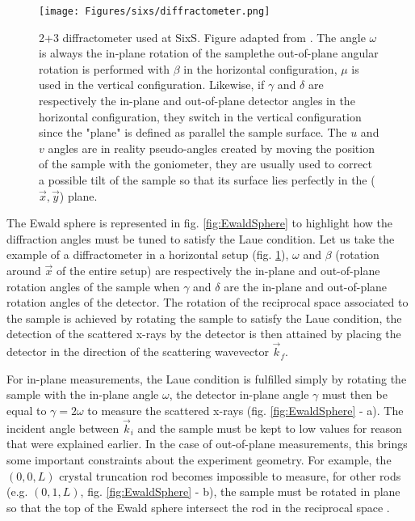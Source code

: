 \begin{figure}[!htb]
    \centering
    \texttt{[image: Figures/sixs/diffractometer.png]}
    \caption{
    2+3 diffractometer used at SixS. Figure adapted from \cite{Schleputz2011}.
    The angle $\omega$ is always the in-plane rotation of the samplethe out-of-plane angular rotation is performed with $\beta$ in the horizontal configuration, $\mu$ is used in the vertical configuration.
    Likewise, if $\gamma$ and $\delta$ are respectively the in-plane and out-of-plane detector angles in the horizontal configuration, they switch in the vertical configuration since the "plane" is defined as parallel the sample surface.
    The $u$ and $v$ angles are in reality pseudo-angles created by moving the position of the sample with the goniometer, they are usually used to correct a possible tilt of the sample so that its surface lies perfectly in the ($\vec{x}, \vec{y}$) plane.
    }
    \label{fig:Diffractometer}
\end{figure}

The Ewald sphere is represented in fig. \ref{fig:EwaldSphere} to highlight how the diffraction angles must be tuned to satisfy the Laue condition.
Let us take the example of a diffractometer in a horizontal setup (fig. \ref{fig:Diffractometer}), $\omega$ and $\beta$ (rotation around $\vec{x}$ of the entire setup) are respectively the in-plane and out-of-plane rotation angles of the sample when $\gamma$ and $\delta$ are the in-plane and out-of-plane rotation angles of the detector.
The rotation of the reciprocal space associated to the sample is achieved by rotating the sample to satisfy the Laue condition, the detection of the scattered x-rays by the detector is then attained by placing the detector in the direction of the scattering wavevector $\vec{k}_f$.

For in-plane measurements, the Laue condition is fulfilled simply by rotating the sample with the in-plane angle $\omega$, the detector in-plane angle $\gamma$ must then be equal to $\gamma = 2 \omega$ to measure the scattered x-rays (fig. \ref{fig:EwaldSphere} - a).
The incident angle between $\vec{k}_i$ and the sample must be kept to low values for reason that were explained earlier.
In the case of out-of-plane measurements, this brings some important constraints about the experiment geometry.
For example, the $(0, 0, L)$ crystal truncation rod becomes impossible to measure, for other rods (e.g. $(0, 1, L)$, fig. \ref{fig:EwaldSphere} - b), the sample must be rotated in plane so that the top of the Ewald sphere intersect the rod in the reciprocal space \parencite{Vlieg1997, Schlepütz2005}.

